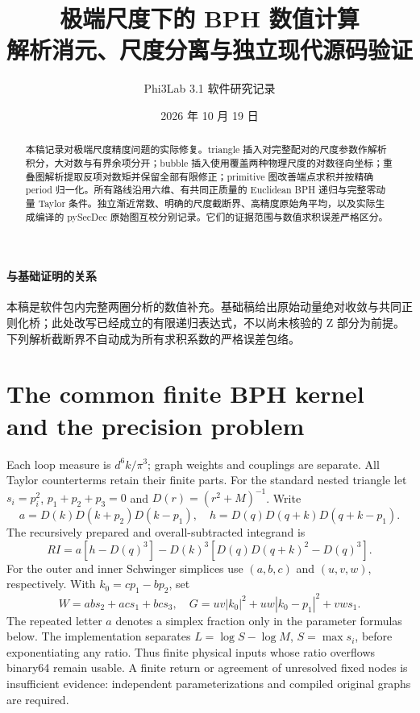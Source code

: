\documentclass[UTF8,a4paper,11pt,fontset=fandol]{ctexart}
\title{极端尺度下的 BPH 数值计算\\\large 解析消元、尺度分离与独立现代源码验证}
\author{Phi3Lab 3.1 软件研究记录}
\date{2026 年 10 月 19 日}
\begin{document}
\pagestyle{plain}\maketitle
\begin{abstract}
本稿记录对极端尺度精度问题的实际修复。triangle 插入对完整配对的尺度参数作解析积分，大对数与有界余项分开；bubble 插入使用覆盖两种物理尺度的对数径向坐标；重叠图解析提取反项对数矩并保留全部有限修正；primitive 图改善端点求积并按精确 period 归一化。所有路线沿用六维、有共同正质量的 Euclidean BPH 递归与完整零动量 Taylor 条件。独立渐近常数、明确的尺度截断界、高精度原始角平均，以及实际生成编译的 pySecDec 原始图互校分别记录。它们的证据范围与数值求积误差严格区分。
\end{abstract}
\paragraph{与基础证明的关系}
本稿是软件包内完整两圈分析的数值补充。基础稿给出原始动量绝对收敛与共同正则化桥；此处改写已经成立的有限递归表达式，不以尚未核验的 Z 部分为前提。下列解析截断界不自动成为所有求积系数的严格误差包络。
\tableofcontents\clearpage
\section{The common finite BPH kernel and the precision problem}
Each loop measure is $d^6k/\pi^3$; graph weights and couplings are separate. All Taylor counterterms retain their finite parts. For the standard nested triangle let $s_i=p_i^2$, $p_1+p_2+p_3=0$ and $D(r)=(r^2+M)^{-1}$. Write
\[
a=D(k)D(k+p_2)D(k-p_1),\quad h=D(q)D(q+k)D(q+k-p_1).
\]
The recursively prepared and overall-subtracted integrand is
\[
RI=a[h-D(q)^3]-D(k)^3[D(q)D(q+k)^2-D(q)^3].
\]
For the outer and inner Schwinger simplices use $(a,b,c)$ and $(u,v,w)$, respectively. With $k_0=cp_1-bp_2$, set
\[
W=ab s_2+ac s_1+bc s_3,\quad G=uv|k_0|^2+uw|k_0-p_1|^2+vw s_1.
\]
The repeated letter $a$ denotes a simplex fraction only in the parameter formulas below. The implementation separates $L=\log S-\log M$, $S=\max s_i$, before exponentiating any ratio. Thus finite physical inputs whose ratio overflows binary64 remain usable. A finite return or agreement of unresolved fixed nodes is insufficient evidence: independent parameterizations and compiled original graphs are required.

\clearpage
\clearpage
\clearpage
\end{document}
